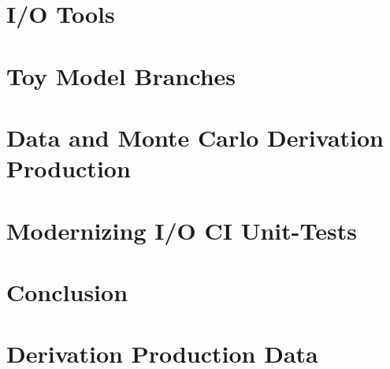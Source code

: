 \documentclass[12pt]{niuthesis}
\begin{document}
\chapter{I/O Tools}
\label{chap:IO_Tools}


\chapter{Toy Model Branches}
\label{chap:Toy_Model}


\chapter{Data and Monte Carlo Derivation Production}
\label{chap:DAODProd}


\chapter{Modernizing I/O CI Unit-Tests}
\label{chap:Modernize}


\chapter{Conclusion}




\printbibliography

\clearpage
\appendix

% 

\chapter{Derivation Production Data}

\end{document}
